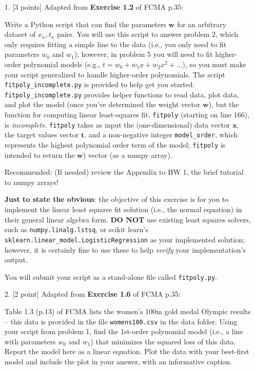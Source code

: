 \documentclass[10pt]{article}
\begin{document}
\newpage
\begin{itemize}



\item[1.] [3 points]
Adapted from {\bf Exercise 1.2} of FCMA p.35:

Write a Python script that can find the parameters $\mathbf{w}$ for an arbitrary dataset of $x_n, t_n$ pairs.  You will use this script to answer problem 2, which only requires fitting a simple line to the data (i.e., you only need to fit parameters $w_0$ and $w_1$); however, in problem 5 you will need to fit higher-order polynomial models (e.g., $t = w_0 + w_1x + w_2x^2 + ...$), so you must make your script generalized to handle higher-order polynomials.  The script {\tt fitpoly\_incomplete.py} is provided to help get you started.  {\tt fitpoly\_incomplete.py} provides helper functions to read data, plot data, and plot the model (once you've determined the weight vector $\mathbf{w}$), but the function for computing linear least-squares fit, {\tt fitpoly} (starting on line 166), is {\em incomplete}.  {\tt fitpoly} takes as input the (one-dimensional) data vector $\mathbf{x}$, the target values vector $\mathbf{t}$, and a non-negative integer {\tt model\_order}, which represents the highest polynomial order term of the model; {\tt fitpoly} is intended to return the $\mathbf{w}$) vector (as a numpy array).

Recommended: (If needed) review the Appendix to HW 1, the brief tutorial to numpy arrays!

{\bf Just to state the obvious}: the objective of this exercise is for you to implement the linear least squares fit solution (i.e., the normal equation) in their general linear algebra form.  {\bf DO NOT} use existing least squares solvers, such as {\tt numpy.linalg.lstsq}, or scikit learn's \\{\tt sklearn.linear\_model.LogisticRegression} as your implemented solution; however, it is certainly fine to use these to help {\em verify} your implementation's output.

You will submit your script as a stand-alone file called {\tt fitpoly.py}.

\item[2.] [2 point]
Adapted from {\bf Exercise 1.6} of FCMA p.35:

Table 1.3 (p.13) of FCMA lists the women's 100m gold medal Olympic results -- this data is provided in the file {\tt womens100.csv} in the data folder.  Using your script from problem 1, find the 1st-order polynomial model (i.e., a line with parameters $w_0$ and $w_1$) that minimizes the squared loss of this data.  Report the model here as a linear equation.  Plot the data with your best-first model and include the plot in your answer, with an informative caption.


\end{itemize}
\end{document}
